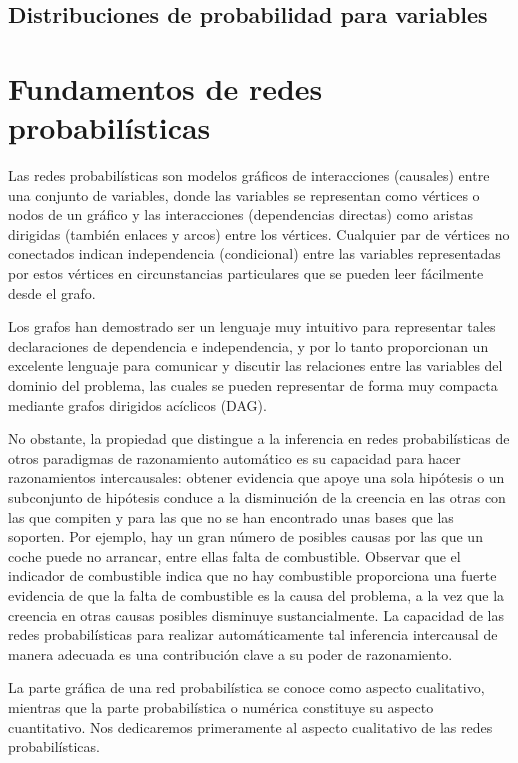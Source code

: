\subsection{Distribuciones de probabilidad para variables}



\section{Fundamentos de redes probabilísticas}
Las redes probabilísticas son modelos gráficos de interacciones (causales) entre una
conjunto de variables, donde las variables se representan como vértices o nodos de un 
gráfico y las interacciones (dependencias directas) como aristas dirigidas (también
enlaces y arcos) entre los vértices. Cualquier par de vértices no conectados indican 
independencia (condicional) entre las variables representadas
por estos vértices en circunstancias particulares que se pueden leer fácilmente desde el
grafo. 

Los grafos han demostrado ser un lenguaje muy intuitivo para representar
tales declaraciones de dependencia e independencia, y por lo tanto proporcionan un excelente
lenguaje para comunicar y discutir las relaciones entre las 
variables del dominio del problema, las cuales se pueden representar de forma muy compacta 
mediante grafos dirigidos acíclicos (DAG).

No obstante, la propiedad que distingue a la inferencia en redes probabilísticas
de otros paradigmas de razonamiento automático es su capacidad para hacer razonamientos intercausales: 
obtener evidencia que apoye una sola hipótesis o un subconjunto de
hipótesis conduce a la disminución de la creencia en las otras con las que compiten y para las que no se 
han encontrado unas bases que las soporten. Por ejemplo, hay un gran número de posibles causas por las 
que un coche puede no arrancar, entre ellas falta de combustible. Observar que el indicador de combustible 
indica que no hay combustible proporciona una fuerte evidencia de que la falta de combustible es la causa 
del problema, a la vez que la creencia en otras causas posibles disminuye sustancialmente. La capacidad 
de las redes probabilísticas para realizar automáticamente tal inferencia intercausal de manera adecuada 
es una contribución clave a su poder de razonamiento.

La parte gráfica de una red probabilística se conoce como aspecto cualitativo, mientras que la 
parte probabilística o numérica constituye su aspecto cuantitativo. Nos dedicaremos primeramente al aspecto 
cualitativo de las redes probabilísticas.

